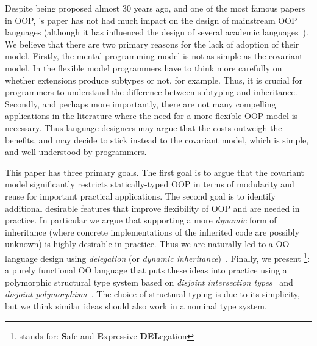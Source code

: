\begin{comment}
\begin{itemize}

\item {\bf Inheritance and subtyping should be decoupled:} 
That is, there should be different mechanisms for class inheritance 
and class/interface subtyping. 

\item {\bf Extensions do not always produce subtypes:} 
There are cases where classes can inherit from other classes without 
producing subtypes. 

\end{itemize}

\end{comment}

Despite being proposed almost 30 years ago, and one of the most famous papers in
OOP, \citeauthor{cook1989inheritance}'s paper has not had much impact on the design of mainstream OOP
languages (although it has influenced the design of several academic
languages~\cite{america1991designing,graver1989type,chambers1992object,bruce1995polytoil}).
We believe that there are two primary reasons for the lack of adoption
of their model.  Firstly, the mental programming model is not
as simple as the covariant model. In the flexible model programmers have to
think more carefully on whether extensions produce subtypes or not,
for example.  Thus, it is crucial for programmers to understand the
difference between subtyping and inheritance.
Secondly, and perhaps more importantly, there are not many compelling applications in
the literature where the need for a more flexible OOP model is
necessary. Thus language designers may argue that the costs outweigh
the benefits, and may decide to stick instead to the covariant 
model, which is simple, and well-understood by programmers. 

This paper has three primary goals. The first goal is to argue that the
covariant model significantly restricts statically-typed OOP in terms of
modularity and reuse for important practical applications. The second goal is to
identify additional desirable features that improve flexibility of OOP and are
needed in practice. In particular we argue that supporting a more \emph{dynamic}
form of inheritance (where concrete implementations of the inherited code are
possibly unknown) is highly desirable in practice. Thus we are naturally led to
a OO language design using \emph{delegation} (or \emph{dynamic
  inheritance})~\cite{ungar1988self,chambers1992object}. Finally, we present
\name\footnote{\name stands for: {\bf S}afe and {\bf E}xpressive {\bf
    DEL}egation}: a purely functional OO language that puts these ideas into
practice using a polymorphic structural type system based on \emph{disjoint
  intersection types}~\cite{oliveira2016disjoint} and \emph{disjoint
  polymorphism}~\cite{alpuimdisjoint}. The choice of structural typing is due to
its simplicity, but we think similar ideas should also work in a nominal type
system.

